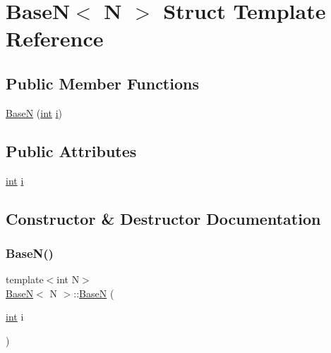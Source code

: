 \hypertarget{struct_base_n}{}\section{BaseN$<$ N $>$ Struct Template Reference}
\label{struct_base_n}
\subsection*{Public Member Functions}
\begin{DoxyCompactItemize}
\item 
\mbox{\hyperlink{struct_base_n_a12002d9d680819f4d7d996cbeff465c9}{BaseN}} (\mbox{\hyperlink{warnings_8h_a74f207b5aa4ba51c3a2ad59b219a423b}{int}} \mbox{\hyperlink{struct_base_n_a3f0cdb98541f97f6040ac1ecafcf30bb}{i}})
\end{DoxyCompactItemize}
\subsection*{Public Attributes}
\begin{DoxyCompactItemize}
\item 
\mbox{\hyperlink{warnings_8h_a74f207b5aa4ba51c3a2ad59b219a423b}{int}} \mbox{\hyperlink{struct_base_n_a3f0cdb98541f97f6040ac1ecafcf30bb}{i}}
\end{DoxyCompactItemize}


\subsection{Constructor \& Destructor Documentation}
\mbox{\label{struct_base_n_a12002d9d680819f4d7d996cbeff465c9}} 
\subsubsection{\texorpdfstring{BaseN()}{BaseN()}}
{\footnotesize\ttfamily template$<$int N$>$ \\
\mbox{\hyperlink{struct_base_n}{BaseN}}$<$ N $>$\+::\mbox{\hyperlink{struct_base_n}{BaseN}} (\begin{DoxyParamCaption}\item[{\mbox{\hyperlink{warnings_8h_a74f207b5aa4ba51c3a2ad59b219a423b}{int}}}]{i }\end{DoxyParamCaption})\hspace{0.3cm}{\ttfamily [inline]}}



